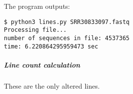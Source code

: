 \begin{Shaded}
\begin{Highlighting}[]


 \OperatorTok{!=} \NormalTok{:}
     \NormalTok{(}\NormalTok{)}

\OperatorTok{=}\NormalTok{ sys.argv[}\NormalTok{]}

\NormalTok{(}\NormalTok{)}
\OperatorTok{=}

 \NormalTok{) } \NormalTok{:}
\OperatorTok{=} 
     \NormalTok{:}
        \NormalTok{ line[}\NormalTok{] }\OperatorTok{==} \NormalTok{:}
\OperatorTok{+=} 

\OperatorTok{=}
\OperatorTok{=}\OperatorTok{{-}}
\NormalTok{(}\SpecialCharTok{\{}\SpecialCharTok{\}}\NormalTok{)}
\NormalTok{(}\SpecialCharTok{\{}\SpecialCharTok{\}}\NormalTok{)}
\end{Highlighting}
\end{Shaded}

The program outputs:

\begin{verbatim}
$ python3 lines.py SRR30833097.fastq
Processing file...
number of sequences in file: 4537365
time: 6.220864295959473 sec
\end{verbatim}

\hypertarget{line-count-calculation}{%
\subparagraph{Line count calculation}\label{line-count-calculation}}

These are the only altered lines.


